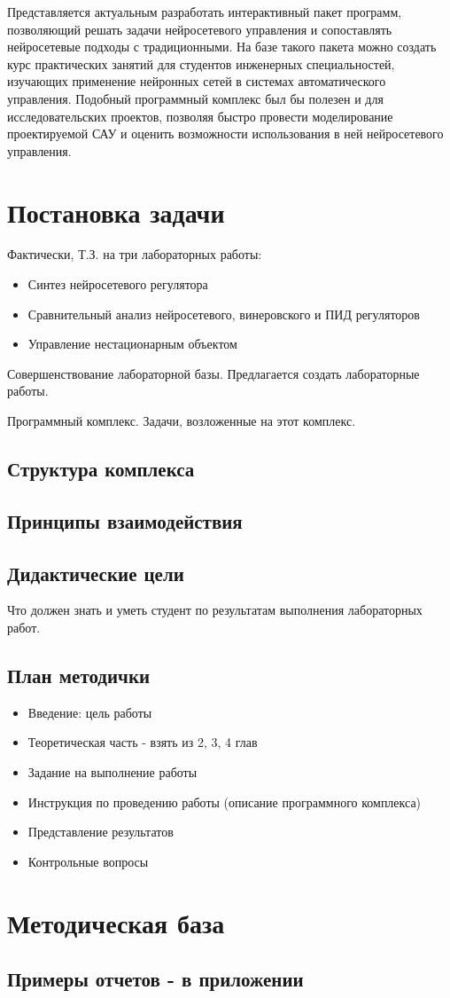 Представляется актуальным разработать интерактивный пакет программ,
позволяющий решать задачи нейросетевого управления и сопоставлять
нейросетевые подходы с традиционными.  На базе такого пакета можно
создать курс практических занятий для студентов инженерных
специальностей, изучающих применение нейронных сетей в системах
автоматического управления.  Подобный программный комплекс был бы
полезен и для исследовательских проектов, позволяя быстро провести
моделирование проектируемой САУ и оценить возможности использования в
ней нейросетевого управления.


\section{Постановка задачи}
Фактически, Т.З. на три лабораторных работы:
\begin{itemize}
\item Синтез нейросетевого регулятора
\item Сравнительный анализ нейросетевого, винеровского и ПИД регуляторов
\item Управление нестационарным объектом
\end{itemize}

Совершенствование лабораторной базы.  Предлагается создать лабораторные работы.

Программный комплекс.
Задачи, возложенные на этот комплекс.

\subsection{Структура комплекса}
\subsection{Принципы взаимодействия}

\subsection{Дидактические цели}
Что должен знать и уметь студент по результатам выполнения лабораторных работ.

\subsection{План методички}
\begin{itemize}
\item Введение: цель работы
\item Теоретическая часть - взять из 2, 3, 4 глав
\item Задание на выполнение работы
\item Инструкция по проведению работы (описание программного комплекса)
\item Представление результатов
\item Контрольные вопросы
\end{itemize}

\section{Методическая база}
\subsection{Примеры отчетов - в приложении}

